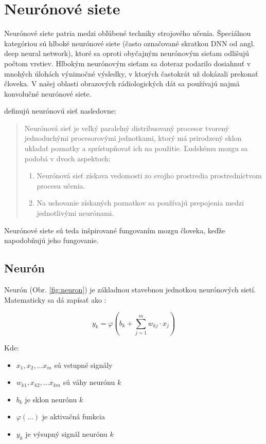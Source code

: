 \section{Neurónové siete}

Neurónové siete patria medzi obľúbené techniky strojového učenia. Špeciálnou kategóriou sú hlboké neurónové siete (často označované skratkou DNN od angl. deep neural network), ktoré sa oproti obyčajným neurónovým sieťam odlišujú počtom vrstiev. Hlbokým neurónovým sieťam sa doteraz podarilo dosiahnuť v mnohých úlohách výnimočné výsledky, v ktorých častokrát už dokázali prekonať človeka. V našej oblasti obrazových rádiologických dát sa používajú najmä konvolučné neurónové siete.

\citeauthor*{haykin2009neural} \cite{haykin2009neural} definujú neurónovú sieť nasledovne: 
\begin{quote}Neurónová sieť je veľký paralelný distribuovaný procesor tvorený jednoduchými procesorovými jednotkami, ktorý má prirodzený sklon ukladať poznatky a sprístupňovať ich na použitie. Ľudskému mozgu sa podobá v dvoch aspektoch: 
    \begin{enumerate}
        \item Neurónová sieť získava vedomosti zo svojho prostredia prostredníctvom procesu učenia.
        \item Na uchovanie získaných poznatkov sa používajú prepojenia medzi jednotlivými neurónami.
    \end{enumerate}
\end{quote}
Neurónové siete sú teda inšpirované fungovaním mozgu človeka, keďže napodobňujú jeho fungovanie.

\subsection{Neurón} 

Neurón (Obr. \ref{fig:neuron}) je základnou stavebnou jednotkou neurónových sietí. Matematicky sa dá zapísať ako \cite{haykin2009neural}:

\begin{equation}
    y_k = \varphi(b_k + \sum_{j=1}^{m} w_{kj}\cdot x_j)
    \label{eq:neuron}
\end{equation}

Kde:
\begin{itemize}
    \item $x_1, x_2, ... x_m$ sú vstupné signály
    \item $w_{k1}, x_{k2}, ... x_{km}$ sú váhy neurónu $k$
    \item $b_k$ je sklon neurónu $k$
    \item $\varphi(...)$ je aktivačná funkcia
    \item $y_k$ je výsupný signál neurónu $k$
\end{itemize}

